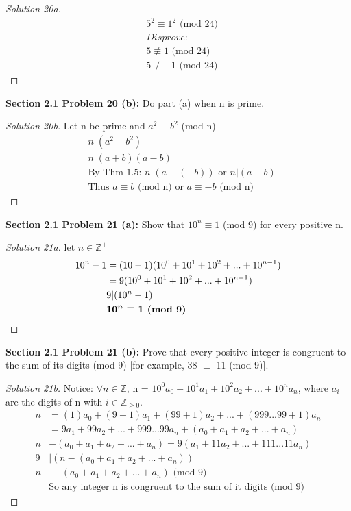 \documentclass[12pt]{article}
\begin{document}
	\begin{proof}[Solution 20a]
		\begin{align*}
			&5^2 \equiv 1^2 \text{ (mod 24)} \\
			&Disprove: \\
			&5 \not \equiv 1 \text{ (mod 24)} \\
			&5 \not \equiv -1 \text{ (mod 24)} 
		\end{align*}
	\end{proof}
\noindent \textbf{Section 2.1 Problem 20 (b): } Do part (a) when n is prime.
	\begin{proof}[Solution 20b]
		Let n be prime and $a^2 \equiv b^2$ (mod n)
		\begin{align*}
			&n | (a^2 - b^2) \\
			&n | (a+b)(a-b) \\
			&\text{By Thm 1.5: } n|(a- (-b)) \text{ or } n|(a-b) \\
			&\text{Thus } a \equiv b \text{ (mod n) or } a \equiv -b \text{ (mod n)}
		\end{align*}
	\end{proof}  
\newpage
\noindent \textbf{Section 2.1 Problem 21 (a): }  Show that $10^n \equiv 1$ (mod 9) for every positive n.
	\begin{proof}[Solution 21a]
		let $n \in \mathbb{Z}^+$
		\begin{align*}
		10^n - 1 &= (10 - 1)(10^0 + 10^1 + 10^2 + ... + 10^{n-1}) \\
		&= 9(10^0 + 10^1 + 10^2 + ... + 10^{n-1}) \\
		&9 | (10^n - 1) \\
		&\textbf{\boldmath $10^n \equiv 1$ (mod 9)}
		\end{align*} 
	\end{proof}
\vspace{\baselineskip}
\noindent \textbf{Section 2.1 Problem 21 (b): } Prove that every positive integer is congruent to the sum of its digits (mod
9) [for example, 38 $\equiv$ 11 (mod 9)].
	\begin{proof}[Solution 21b]
		Notice: $\forall n \in \mathbb{Z}$, n = $10^0 a_0 + 10^1 a_1 + 10^2 a_2 + ... + 10^n a_n$, where $a_i$ are the digits of n with $ i \in \mathbb{Z}_{\geq 0}$.
		\begin{align*}
			n &= (1)a_0 + (9 + 1)a_1 + (99 + 1)a_2 +...+(999...99 + 1)a_n \\
			&= 9a_1 + 99a_2 + ... + 999...99a_n + (a_0 + a_1 + a_2 + ... + a_n) \\
			n &- (a_0 + a_1 + a_2 + ... + a_n) = 9(a_1 + 11a_2 + ... + 111...11a_n) \\
			9 &| (n- (a_0 + a_1 + a_2 + ... + a_n)) \\
			n &\equiv (a_0 + a_1 + a_2 + ... + a_n) \text{ (mod 9)} \\
			&\text{So any integer n is congruent to the sum of it digits (mod 9)}
		\end{align*}
	\end{proof}
\end{document}
